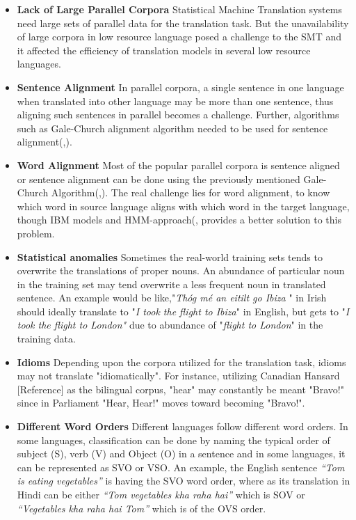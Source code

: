 \begin{itemize}
    \item \textbf{Lack of Large Parallel Corpora}   Statistical Machine Translation systems need large sets of parallel data for the translation task. But the unavailability of large corpora in low resource language posed a challenge to the SMT and it affected the efficiency of translation models in several low resource languages.
    \item\textbf{Sentence Alignment }   In parallel corpora, a single sentence in one language when translated into other language may be more than one sentence, thus aligning such sentences in parallel becomes a challenge. Further, algorithms such as Gale-Church alignment algorithm needed to be used for sentence alignment(\citeauthor{Gale:1991:PAS:981344.981367},\citeyear{Gale:1991:PAS:981344.981367}).
     \item\textbf{Word Alignment }      Most of the popular parallel corpora is sentence aligned or sentence alignment can be done using the previously mentioned Gale-Church Algorithm(\citeauthor{Gale:1991:PAS:981344.981367},\citeyear{Gale:1991:PAS:981344.981367}). The real challenge lies for word alignment, to know which word in source language aligns with which word in the target language, though IBM models and HMM-approach(\citeauthor{Vogel:1996:HWA:993268.993313},\citeyear{Vogel:1996:HWA:993268.993313} provides a better solution to this problem. 
     \item\textbf{Statistical anomalies }  Sometimes the real-world training sets tends to overwrite the translations of proper nouns. An abundance of particular noun in the training set may tend overwrite a less frequent noun in translated sentence. An example would be like,"\textit{Thóg mé an eitilt go Ibiza} " in Irish should ideally translate to "\textit{I took the flight to Ibiza}" in English, but gets to "\textit{I took the  flight to London"} due to abundance of "\textit{flight to London}" in the training data.
     \item\textbf{Idioms }Depending upon the corpora utilized for the translation task, idioms may not translate "idiomatically". For instance, utilizing Canadian Hansard [Reference] as the bilingual corpus, "hear" may constantly be meant "Bravo!" since in Parliament "Hear, Hear!" moves toward becoming "Bravo!". 
     \item\textbf{Different Word Orders}    Different languages follow different word orders. In some languages, classification can be done by naming the typical order of subject (S), verb (V) and Object (O) in a sentence and in some languages, it can be represented as SVO or VSO. An example, the English sentence \textit{“Tom is eating vegetables”} is having the SVO word order, where as its translation in Hindi can be either \textit{“Tom vegetables kha raha hai”} which is SOV or \textit{“Vegetables kha raha hai Tom”} which is of the OVS order. 

\end{itemize}
